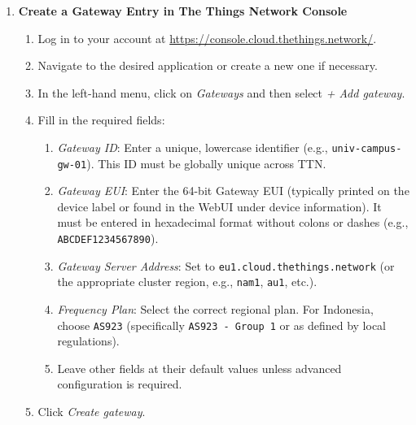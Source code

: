 \begin{enumerate}
    \item \textbf{Create a Gateway Entry in The Things Network Console}
          \begin{enumerate}
              \item Log in to your account at \url{https://console.cloud.thethings.network/}.
              \item Navigate to the desired application or create a new one if necessary.
              \item In the left-hand menu, click on \textit{Gateways} and then select \textit{+ Add gateway}.
              \item Fill in the required fields:
                    \begin{enumerate}
                        \item \textit{Gateway ID}: Enter a unique, lowercase identifier (e.g., \texttt{univ-campus-gw-01}). This ID must be globally unique across TTN.
                        \item \textit{Gateway EUI}: Enter the 64-bit Gateway EUI (typically printed on the device label or found in the WebUI under device information). It must be entered in hexadecimal format without colons or dashes (e.g., \texttt{ABCDEF1234567890}).
                        \item \textit{Gateway Server Address}: Set to \texttt{eu1.cloud.thethings.network} (or the appropriate cluster region, e.g., \texttt{nam1}, \texttt{au1}, etc.).
                        \item \textit{Frequency Plan}: Select the correct regional plan. For Indonesia, choose \texttt{AS923} (specifically \texttt{AS923 - Group 1} or as defined by local regulations).
                        \item Leave other fields at their default values unless advanced configuration is required.
                    \end{enumerate}
              \item Click \textit{Create gateway}.
          \end{enumerate}


\end{enumerate}
